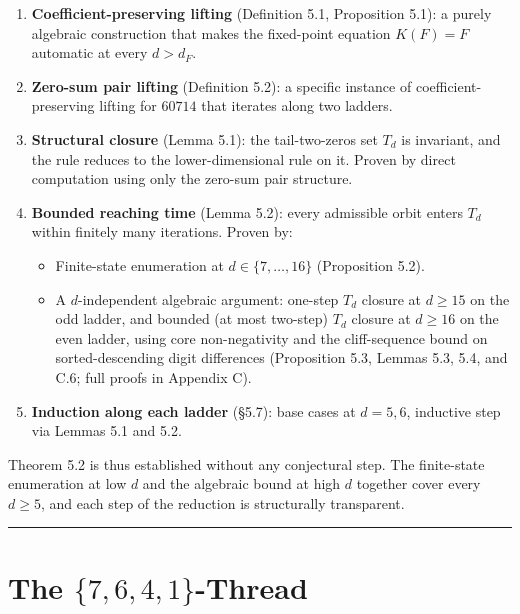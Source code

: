 \documentclass[11pt,letterpaper]{article}
\providecommand{\tightlist}{%
  \setlength{\itemsep}{0pt}\setlength{\parskip}{0pt}}
\theoremstyle{paperstyle}
\theoremstyle{paperstyledef}
\theoremstyle{paperstylerem}
\begin{document}
\begin{enumerate}
\def\labelenumi{\arabic{enumi}.}
\item
  \textbf{Coefficient-preserving lifting} (Definition 5.1, Proposition
  5.1): a purely algebraic construction that makes the fixed-point
  equation \(K(F) = F\) automatic at every \(d > d_F\).
\item
  \textbf{Zero-sum pair lifting} (Definition 5.2): a specific instance
  of coefficient-preserving lifting for \(60714\) that iterates along
  two ladders.
\item
  \textbf{Structural closure} (Lemma 5.1): the tail-two-zeros set
  \(T_d\) is invariant, and the rule reduces to the lower-dimensional
  rule on it. Proven by direct computation using only the zero-sum pair
  structure.
\item
  \textbf{Bounded reaching time} (Lemma 5.2): every admissible orbit
  enters \(T_d\) within finitely many iterations. Proven by:

  \begin{itemize}
  \tightlist
  \item
    Finite-state enumeration at \(d \in \{7, \ldots, 16\}\) (Proposition
    5.2).
  \item
    A \(d\)-independent algebraic argument: one-step \(T_d\) closure at
    \(d \geq 15\) on the odd ladder, and bounded (at most two-step)
    \(T_d\) closure at \(d \geq 16\) on the even ladder, using core
    non-negativity and the cliff-sequence bound on sorted-descending
    digit differences (Proposition 5.3, Lemmas 5.3, 5.4, and C.6; full
    proofs in Appendix C).
  \end{itemize}
\item
  \textbf{Induction along each ladder} (§5.7): base cases at
  \(d = 5, 6\), inductive step via Lemmas 5.1 and 5.2.
\end{enumerate}

Theorem 5.2 is thus established without any conjectural step. The
finite-state enumeration at low \(d\) and the algebraic bound at high
\(d\) together cover every \(d \geq 5\), and each step of the reduction
is structurally transparent.

\begin{center}\rule{0.5\linewidth}{0.5pt}\end{center}

\hypertarget{the-7-6-4-1-thread}{%
\section{The \(\{7, 6, 4, 1\}\)-Thread}\label{the-7-6-4-1-thread}}
\end{document}

